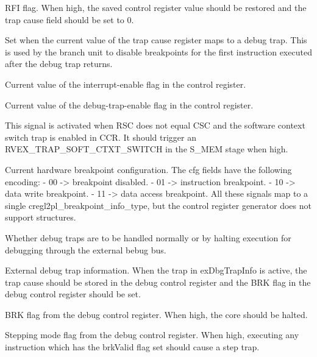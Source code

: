 \ifaceSubGroup{}
RFI flag. When high, the saved control register value should be restored and the 
trap cause field should be set to 0.

\ifaceSubGroup{}
Set when the current value of the trap cause register maps to a debug trap. This 
is used by the branch unit to disable breakpoints for the first instruction 
executed after the debug trap returns.

\ifaceSubGroup{}
Current value of the interrupt-enable flag in the control register.

\ifaceSubGroup{}
Current value of the debug-trap-enable flag in the control register.

\ifaceSubGroup{}
This signal is activated when RSC does not equal CSC and the software context
switch trap is enabled in CCR. It should trigger an RVEX_TRAP_SOFT_CTXT_SWITCH
in the S_MEM stage when high.

\ifaceSubGroup{}
Current hardware breakpoint configuration. The cfg fields have the following
encoding:
 - 00 -> breakpoint disabled.
 - 01 -> instruction breakpoint.
 - 10 -> data write breakpoint.
 - 11 -> data access breakpoint.
All these signals map to a single cregl2pl_breakpoint_info_type, but the
control register generator does not support structures.

\ifaceSubGroup{}
Whether debug traps are to be handled normally or by halting execution for 
debugging through the external bebug bus.

\ifaceSubGroup{}
External debug trap information. When the trap in exDbgTrapInfo is active, the 
trap cause should be stored in the debug control register and the BRK flag in 
the debug control register should be set.

\ifaceSubGroup{}
BRK flag from the debug control register. When high, the core should be halted.

\ifaceSubGroup{}
Stepping mode flag from the debug control register. When high, executing any 
instruction which has the brkValid flag set should cause a step trap.

